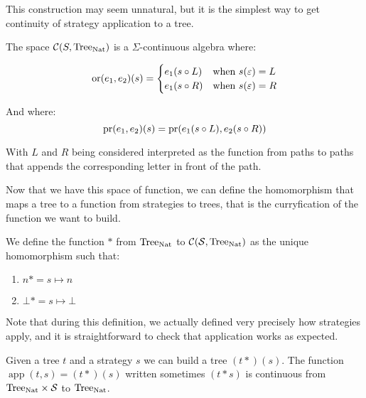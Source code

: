 This construction may seem unnatural, but it is the simplest 
way to get continuity of strategy application to a tree.

\begin{adefinition}
    The space $\mathcal{C}(S,\textnormal{Tree}_{\textnormal{Nat}})$ is a $\Sigma$-continuous 
    algebra where:

    \begin{equation*}
        \operatorname{or} (e_1,e_2) (s) = 
        \begin{cases}
            e_1 (s \circ L) & \text{when } s(\varepsilon) = L \\
            e_1 (s \circ R) & \text{when } s(\varepsilon) = R 
        \end{cases}
    \end{equation*}

    And where:
    \begin{equation*}
        \operatorname{pr} (e_1,e_2) (s) = \operatorname{pr} (e_1 (s \circ L), e_2 (s \circ R)) 
    \end{equation*}

    With $L$ and $R$ being considered interpreted as the function 
    from paths to paths that appends the corresponding letter in front of 
    the path.
\end{adefinition}

Now that we have this space of function, we can define the 
homomorphism that maps a tree to a function from strategies 
to trees, that is the curryfication of the function we want to build.

\begin{adefinition}
    We define the function $*$ from $\textnormal{Tree}_{\textnormal{Nat}}$ to $\mathcal{C}(\mathcal{S},\textnormal{Tree}_{\textnormal{Nat}})$
    as the unique homomorphism such that:

    \begin{enumerate}
        \item $n* = s \mapsto n$
        \item $\bot* = s \mapsto \bot$
    \end{enumerate}
\end{adefinition}

Note that during this definition, we actually defined very precisely 
how strategies apply, and it is straightforward to check that 
application works as expected.

\begin{alemma}[Continuity]
    Given a tree $t$ and a strategy $s$ we can 
    build a tree $(t*) (s)$. The function 
    $\operatorname{app}(t,s) = (t*)(s)$ written sometimes
    $(t*s)$ 
    is continuous 
    from $\textnormal{Tree}_{\textnormal{Nat}} \times \mathcal{S}$ to $\textnormal{Tree}_{\textnormal{Nat}}$.
\end{alemma}

